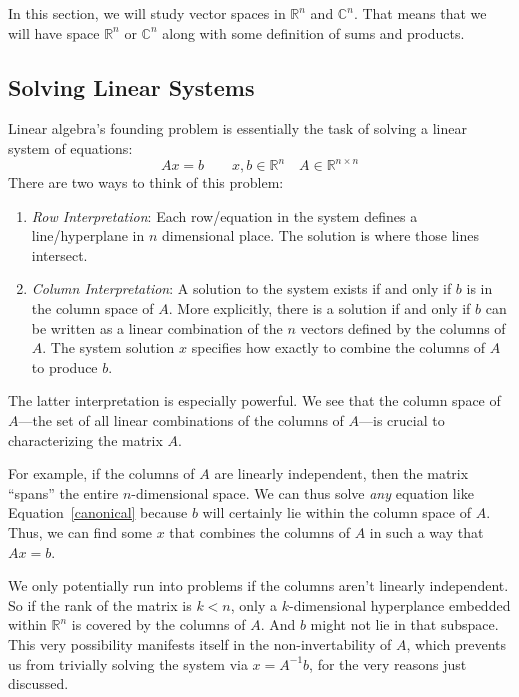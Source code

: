 \documentclass[12pt]{article}
\numberwithin{equation}{section} %
\theoremstyle{plain}
\theoremstyle{definition}
\theoremstyle{remark}
\newcommand{\Rn}{\mathbb{R}^n}
\newcommand{\Rnn}{\mathbb{R}^{n\times n}}
\newcommand{\Cn}{\mathbb{C}^n}
\begin{document}
In this section, we will study vector spaces in $\Rn$ and $\Cn$.  That
means that we will have space $\Rn$ or $\Cn$ along with some definition
of sums and products.

\subsection{Solving Linear Systems}

Linear algebra's founding problem is essentially the task of solving a
linear system of equations:
\begin{equation}
    \label{canonical}
    Ax = b
    \qquad x,b\in \Rn
    \quad A \in \Rnn
\end{equation}
There are two ways to think of this problem:
\begin{enumerate}
  \item {\sl Row Interpretation}:
    Each row/equation in the system defines a line/hyperplane in $n$
    dimensional place. The solution is where those lines intersect.
  \item {\sl Column Interpretation}:
    A solution to the system exists if and only if $b$ is in the
    column space of $A$. More explicitly, there is a solution if and
    only if $b$ can be written as a linear combination of the $n$
    vectors defined by the columns of $A$.
    The system solution $x$ specifies how exactly to combine the columns
    of $A$ to produce $b$.
\end{enumerate}
The latter interpretation is especially powerful. We see that the column
space of $A$---the set of all linear combinations of the columns of
$A$---is crucial to characterizing the matrix $A$.

For example, if the columns of $A$ are linearly independent, then the
matrix ``spans'' the entire $n$-dimensional space. We can thus solve
\emph{any} equation like Equation~\ref{canonical} because $b$ will
certainly lie within the column space of $A$. Thus, we can find some $x$
that combines the columns of $A$ in such a way that $Ax=b$.

We only potentially run into problems if the columns aren't linearly
independent. So if the rank of the matrix is $k<n$, only a
$k$-dimensional hyperplance embedded within $\mathbb{R}^n$ is covered by
the columns of $A$. And $b$ might not lie in that subspace. This very
possibility manifests itself in the non-invertability of $A$, which
prevents us from trivially solving the system via $x = A^{-1}b$, for the
very reasons just discussed.
\end{document}
